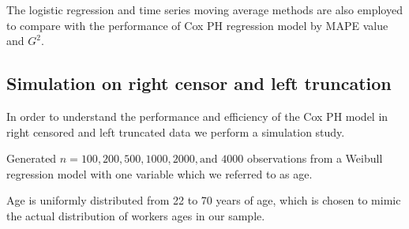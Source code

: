 \documentclass[12pt,letterpaper]{article}
\begin{document}
The logistic regression and time series moving average methods are also employed to compare with the  performance of Cox PH regression model by MAPE value and $G^2$.



%
 \subsection{Simulation on right censor and left truncation}

 In order to understand the performance and efficiency of the Cox PH model in right censored and left truncated data we perform a simulation study.

 Generated $n =100, 200, 500, 1000, 2000, \text{and } 4000$ observations  from a Weibull regression model  with one variable which we referred to as age.

 Age is uniformly distributed from 22 to 70 years of age, which is chosen to mimic the actual distribution of workers ages in our sample.
\end{document}

